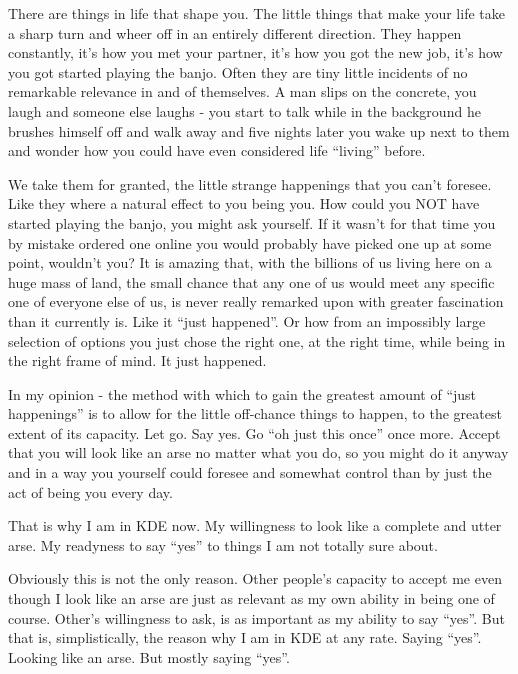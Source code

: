 

\noindent{}There are things in life that shape you. The little things that make your life take a sharp turn and wheer off in an entirely different direction.
They happen constantly, it's how you met your partner, it's how you got the new job, it's how you got started playing the banjo. Often they are tiny little incidents of no remarkable relevance in and of themselves. A man slips on the concrete, you laugh and someone else laughs - you start to talk while in the background he brushes himself off and walk away and five nights later you wake up next to them and wonder how you could have even considered life “living” before.

We take them for granted, the little strange happenings that you can't foresee. Like they where a natural effect to you being you. How could you NOT have started playing the banjo, you might ask yourself. If it wasn't for that time you by mistake ordered one online you would probably have picked one up at some point, wouldn't you?
It is amazing that, with the billions of us living here on a huge mass of land, the small chance that any one of us would meet any specific one of everyone else of us, is never really remarked upon with greater fascination than it currently is. Like it “just happened”.  Or how from an impossibly large selection of options you just chose the right one, at the right time, while being in the right frame of mind. It just happened.

In my opinion - the method with which to gain the greatest amount of “just happenings” is to allow for the little off-chance things to happen, to the greatest extent of its capacity. Let go. Say yes. Go “oh just this once” once more. Accept that you will look like an arse no matter what you do, so you might do it anyway and in a way you yourself could foresee and somewhat control than by just the act of being you every day. 

That is why I am in KDE now. My willingness to look like a complete and utter arse. My readyness to say “yes” to things I am not totally sure about.

Obviously this is not the only reason. Other people's capacity to accept me even though I look like an arse are just as relevant as my own ability in being one of course. Other's willingness to ask, is as important as my ability to say “yes”. But that is, simplistically, the reason why I am in KDE at any rate. Saying “yes”. Looking like an arse. But mostly saying “yes”.

